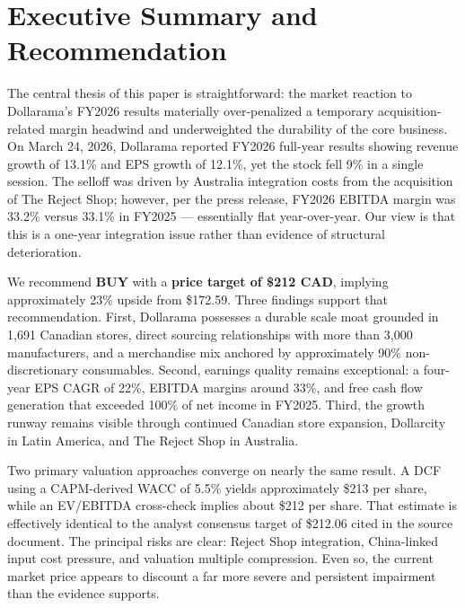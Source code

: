 \documentclass[11pt]{article}
\begin{document}
\section*{Executive Summary and Recommendation}
The central thesis of this paper is straightforward: the market reaction to Dollarama's FY2026 results materially over-penalized a temporary acquisition-related margin headwind and underweighted the durability of the core business. On March 24, 2026, Dollarama reported FY2026 full-year results showing revenue growth of 13.1\% and EPS growth of 12.1\%, yet the stock fell 9\% in a single session. The selloff was driven by Australia integration costs from the acquisition of The Reject Shop; however, per the press release, FY2026 EBITDA margin was 33.2\% versus 33.1\% in FY2025 --- essentially flat year-over-year. Our view is that this is a one-year integration issue rather than evidence of structural deterioration.

We recommend \textbf{BUY} with a \textbf{price target of \$212 CAD}, implying approximately 23\% upside from \$172.59. Three findings support that recommendation. First, Dollarama possesses a durable scale moat grounded in 1,691 Canadian stores, direct sourcing relationships with more than 3,000 manufacturers, and a merchandise mix anchored by approximately 90\% non-discretionary consumables. Second, earnings quality remains exceptional: a four-year EPS CAGR of 22\%, EBITDA margins around 33\%, and free cash flow generation that exceeded 100\% of net income in FY2025. Third, the growth runway remains visible through continued Canadian store expansion, Dollarcity in Latin America, and The Reject Shop in Australia.

Two primary valuation approaches converge on nearly the same result. A DCF using a CAPM-derived WACC of 5.5\% yields approximately \$213 per share, while an EV/EBITDA cross-check implies about \$212 per share. That estimate is effectively identical to the analyst consensus target of \$212.06 cited in the source document. The principal risks are clear: Reject Shop integration, China-linked input cost pressure, and valuation multiple compression. Even so, the current market price appears to discount a far more severe and persistent impairment than the evidence supports.
\end{document}
